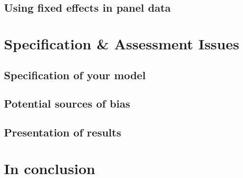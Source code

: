\documentclass[
]{book}
\begin{document}
\hypertarget{using-fixed-effects-in-panel-data}{%
\section{Using fixed effects in panel data}\label{using-fixed-effects-in-panel-data}}

\hypertarget{ch:specification}{%
\chapter{Specification \& Assessment Issues}\label{ch:specification}}

\hypertarget{specification-of-your-model}{%
\section{Specification of your model}\label{specification-of-your-model}}

\hypertarget{potential-sources-of-bias}{%
\section{Potential sources of bias}\label{potential-sources-of-bias}}

\hypertarget{presentation-of-results}{%
\section{Presentation of results}\label{presentation-of-results}}

\hypertarget{in-conclusion}{%
\chapter{In conclusion}\label{in-conclusion}}
\end{document}
